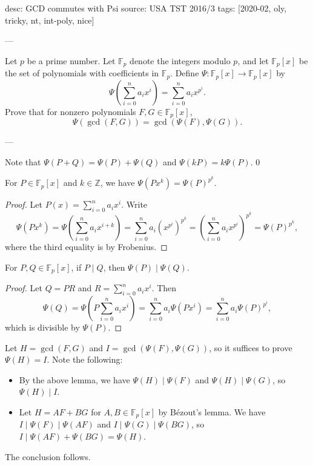 desc: GCD commutes with Psi
source: USA TST 2016/3
tags: [2020-02, oly, tricky, nt, int-poly, nice]

---

Let $p$ be a prime number. Let $\mathbb F_p$ denote the integers modulo $p$, and let $\mathbb F_p[x]$ be the set of polynomials with coefficients in $\mathbb F_p$. Define $\Psi:\mathbb F_p[x]\to\mathbb F_p[x]$ by \[\Psi\left(\sum_{i=0}^na_ix^i\right)=\sum_{i=0}^na_ix^{p^i}.\]
Prove that for nonzero polynomials $F,G\in\mathbb F_p[x]$, \[\Psi(\gcd(F,G))=\gcd(\Psi(F),\Psi(G)).\]

---

Note that $\Psi(P+Q)=\Psi(P)+\Psi(Q)$ and $\Psi(kP)=k\Psi(P)$.
\setcounter{lemma}0
\begin{lemma}
    For $P\in\mathbb F_p[x]$ and $k\in\mathbb Z$, we have $\Psi(Px^k)=\Psi(P)^{p^k}$.
\end{lemma}
\begin{proof}
    Let $P(x)=\sum_{i=0}^na_ix^i$. Write \[\Psi(Px^k)=\Psi\left(\sum_{i=0}^na_ix^{i+k}\right)=\sum_{i=0}^na_i\left(x^{p^i}\right)^{p^k}=\left(\sum_{i=0}^na_ix^{p^i}\right)^{p^k}=\Psi(P)^{p^k},\]
    where the third equality is by Frobenius.
\end{proof}
\begin{lemma}
    For $P,Q\in\mathbb F_p[x]$, if $P\mid Q$, then $\Psi(P)\mid\Psi(Q)$.
\end{lemma}
\begin{proof}
    Let $Q=PR$ and $R=\sum_{i=0}^na_ix^i$. Then \[\Psi(Q)=\Psi\left(P\sum_{i=0}^na_ix^i\right)=\sum_{i=0}^na_i\Psi(Px^i)=\sum_{i=0}^na_i\Psi(P)^{p^i},\]
    which is divisible by $\Psi(P)$.
\end{proof}

Let $H=\gcd(F,G)$ and $I=\gcd(\Psi(F),\Psi(G))$, so it suffices to prove $\Psi(H)=I$. Note the following:
\begin{itemize}
    \item By the above lemma, we have $\Psi(H)\mid\Psi(F)$ and $\Psi(H)\mid\Psi(G)$, so $\Psi(H)\mid I$.
    \item Let $H=AF+BG$ for $A,B\in\mathbb F_p[x]$ by B\'ezout's lemma. We have $I\mid\Psi(F)\mid\Psi(AF)$ and $I\mid\Psi(G)\mid\Psi(BG)$, so $I\mid\Psi(AF)+\Psi(BG)=\Psi(H)$.
\end{itemize}
The conclusion follows.
